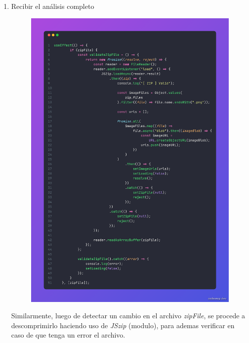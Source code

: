 \documentclass[letterpaper, 12pt]{article}
\begin{document}
\begin{enumerate}
	\item Recibir el análisis completo
	      \begin{figure}[H]
		      \begin{center}
			      \includegraphics[width=.7\linewidth]{Images/SendAudioToAPI.png}
		      \end{center}
	      \end{figure}

	      Similarmente, luego de detectar un cambio en el archivo
	      \textit{zipFile}, se procede a descomprimirlo haciendo uso
	      de \textit{JSzip} (modulo), para ademas verificar en caso
	      de que tenga un error el archivo.


\end{enumerate}
\end{document}
